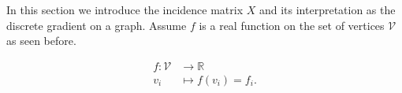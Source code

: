 \documentclass[12pt,a4paper]{report}
\theoremstyle{definition}
\begin{document}
In this section we introduce the incidence matrix $X$ and its interpretation as the discrete gradient on a graph.
Assume $f$ is a real function on the set of vertices $\mathcal{V}$ as seen before.
\begin{figure}[h]
\begin{minipage}[]{0.45\linewidth}
\begin{align*}
    f \colon \mathcal{V} & \longrightarrow \mathbb{R} \\
    v_i & \longmapsto f(v_i) = f_i .
\end{align*}
\end{minipage}
\hspace{0.5cm}
\begin{minipage}[]{0.45\linewidth}
    \centering
    \resizebox{0.75 \textwidth}{!}{
        \begin{tikzpicture}[x=0.75pt,y=0.75pt,yscale=-1,xscale=1]


\end{tikzpicture}}
\end{minipage}
\end{figure}
\end{document}
